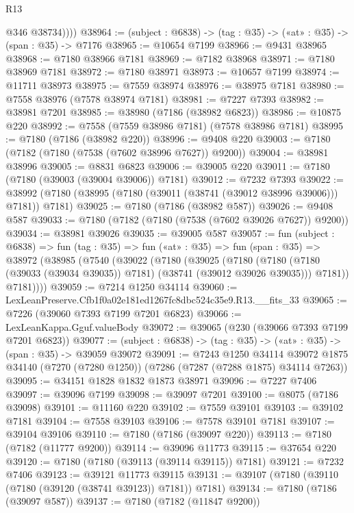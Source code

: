 \begin{lexlean}{R13}
\begin{coremodule}
            @346
            @38734))))
@38964 := (subject : @6838) -> (tag : @35) -> («at» : @35) -> (span : @35) -> @7176
@38965 := @10654 @7199
@38966 := @9431 @38965
@38968 := @7180 @38966 @7181
@38969 := @7182 @38968
@38971 := @7180 @38969 @7181
@38972 := @7180 @38971
@38973 := @10657 @7199
@38974 := @11711 @38973
@38975 := @7559 @38974
@38976 := @38975 @7181
@38980 := @7558 @38976 (@7578 @38974 @7181)
@38981 := @7227 @7393
@38982 := @38981 @7201
@38985 := @38980 (@7186 (@38982 @6823))
@38986 := @10875 @220
@38992 := @7558 (@7559 @38986 @7181) (@7578 @38986 @7181)
@38995 := @7180 (@7186 (@38982 @220))
@38996 := @9408 @220
@39003 := @7180 (@7182 (@7180 (@7538 (@7602 @38996 @7627)) @9200))
@39004 := @38981 @38996
@39005 := @8831 @6823
@39006 := @39005 @220
@39011 := @7180 (@7180 (@39003 (@39004 @39006)) @7181)
@39012 := @7232 @7393
@39022 := @38992 (@7180 (@38995 (@7180 (@39011 (@38741 (@39012 @38996 @39006))) @7181)) @7181)
@39025 := @7180 (@7186 (@38982 @587))
@39026 := @9408 @587
@39033 := @7180 (@7182 (@7180 (@7538 (@7602 @39026 @7627)) @9200))
@39034 := @38981 @39026
@39035 := @39005 @587
@39057 := fun (subject : @6838) =>
  fun (tag : @35) =>
  fun («at» : @35) =>
  fun (span : @35) =>
  @38972
    (@38985
      (@7540
        (@39022
          (@7180
            (@39025
              (@7180
                (@7180 (@7180 (@39033 (@39034 @39035)) @7181) (@38741 (@39012 @39026 @39035)))
                @7181))
            @7181))))
@39059 := @7214 @1250 @34114
@39060 := LexLeanPreserve.Cfb1f0a02e181ed1267fc8dbc524c35e9.R13.__fits_33
@39065 := @7226 (@39060 @7393 @7199 @7201 @6823)
@39066 := LexLeanKappa.Gguf.valueBody
@39072 := @39065 (@230 (@39066 @7393 @7199 @7201 @6823))
@39077 := (subject : @6838) -> (tag : @35) -> («at» : @35) -> (span : @35) -> @39059 @39072
@39091 := @7243
    @1250
    @34114
    @39072
    @1875
    @34140
    (@7270 (@7280 @1250))
    (@7286 (@7287 (@7288 @1875) @34114 @7263))
@39095 := @34151 @1828 @1832 @1873 @38971
@39096 := @7227 @7406
@39097 := @39096 @7199
@39098 := @39097 @7201
@39100 := @8075 (@7186 @39098)
@39101 := @11160 @220
@39102 := @7559 @39101
@39103 := @39102 @7181
@39104 := @7558 @39103
@39106 := @7578 @39101 @7181
@39107 := @39104 @39106
@39110 := @7180 (@7186 (@39097 @220))
@39113 := @7180 (@7182 (@11777 @9200))
@39114 := @39096 @11773
@39115 := @37654 @220
@39120 := @7180 (@7180 (@39113 (@39114 @39115)) @7181)
@39121 := @7232 @7406
@39123 := @39121 @11773 @39115
@39131 := @39107 (@7180 (@39110 (@7180 (@39120 (@38741 @39123)) @7181)) @7181)
@39134 := @7180 (@7186 (@39097 @587))
@39137 := @7180 (@7182 (@11847 @9200))

\end{coremodule}
\end{lexlean}
